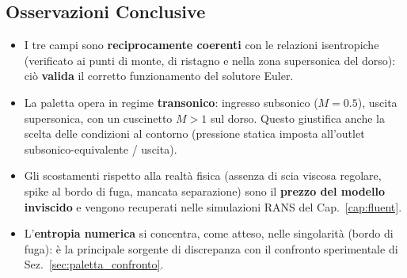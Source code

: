 \subsection{Osservazioni Conclusive}
\label{sec:paletta_oss}

\begin{itemize}
  \item I tre campi sono \textbf{reciprocamente coerenti} con le relazioni isentropiche
    (verificato ai punti di monte, di ristagno e nella zona supersonica del dorso): ciò
    \textbf{valida} il corretto funzionamento del solutore Euler.
  \item La paletta opera in regime \textbf{transonico}: ingresso subsonico ($M = 0.5$), uscita
    supersonica, con un cuscinetto $M > 1$ sul dorso. Questo giustifica anche la scelta delle
    condizioni al contorno (pressione statica imposta all'outlet subsonico-equivalente / uscita).
  \item Gli scostamenti rispetto alla realtà fisica (assenza di scia viscosa regolare, spike al
    bordo di fuga, mancata separazione) sono il \textbf{prezzo del modello inviscido} e vengono
    recuperati nelle simulazioni RANS del Cap.~\ref{cap:fluent}.
  \item L'\textbf{entropia numerica} si concentra, come atteso, nelle singolarità (bordo di fuga):
    è la principale sorgente di discrepanza con il confronto sperimentale di
    Sez.~\ref{sec:paletta_confronto}.
\end{itemize}
